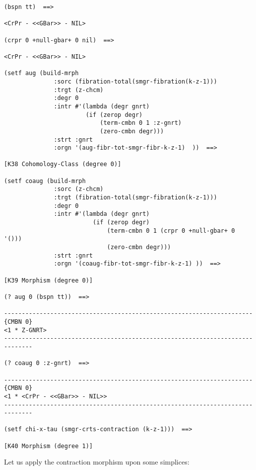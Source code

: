 {\footnotesize\begin{verbatim}
(bspn tt)  ==>

<CrPr - <<GBar>> - NIL>

(crpr 0 +null-gbar+ 0 nil)  ==>

<CrPr - <<GBar>> - NIL>

(setf aug (build-mrph
              :sorc (fibration-total(smgr-fibration(k-z-1)))
              :trgt (z-chcm)
              :degr 0
              :intr #'(lambda (degr gnrt)
                       (if (zerop degr)
                           (term-cmbn 0 1 :z-gnrt)
                           (zero-cmbn degr)))
              :strt :gnrt
              :orgn '(aug-fibr-tot-smgr-fibr-k-z-1)  ))  ==>

[K38 Cohomology-Class (degree 0)]

(setf coaug (build-mrph
              :sorc (z-chcm)
              :trgt (fibration-total(smgr-fibration(k-z-1)))
              :degr 0
              :intr #'(lambda (degr gnrt)
                         (if (zerop degr)
                             (term-cmbn 0 1 (crpr 0 +null-gbar+ 0 '()))
                             (zero-cmbn degr)))
              :strt :gnrt
              :orgn '(coaug-fibr-tot-smgr-fibr-k-z-1) ))  ==>

[K39 Morphism (degree 0)]

(? aug 0 (bspn tt))  ==>

----------------------------------------------------------------------{CMBN 0}
<1 * Z-GNRT>
------------------------------------------------------------------------------

(? coaug 0 :z-gnrt)  ==>

----------------------------------------------------------------------{CMBN 0}
<1 * <CrPr - <<GBar>> - NIL>>
------------------------------------------------------------------------------

(setf chi-x-tau (smgr-crts-contraction (k-z-1)))  ==>

[K40 Morphism (degree 1)]
\end{verbatim}}
Let us apply the contraction morphism upon some simplices:
